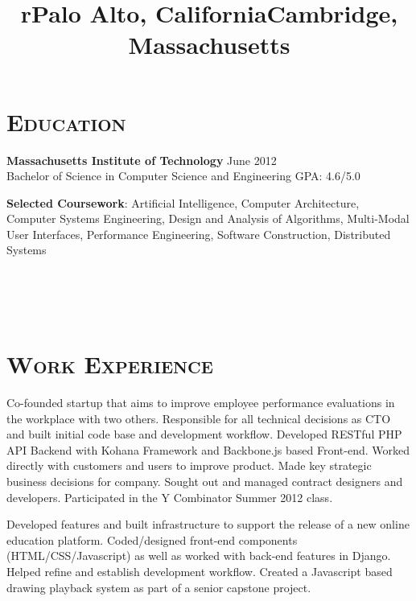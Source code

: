 \begin{resume}


\section{\textsc{Education}}

\textbf{Massachusetts Institute of Technology} \hfill{June 2012}\\
Bachelor of Science in Computer Science and Engineering \hfill{GPA: 4.6/5.0} 

\textbf{Selected Coursework}: Artificial Intelligence, Computer Architecture, Computer Systems Engineering, Design and Analysis of Algorithms, Multi-Modal User Interfaces, Performance Engineering, Software Construction, Distributed Systems



\begin{formatb}
  \title{r}\\
  \\
  \body\\
\end{formatb}

\section{\textsc{Work Experience}}

\title{Palo Alto, California}
\begin{position}
Co-founded startup that aims to improve employee performance evaluations in the workplace with two others. Responsible for all technical decisions as CTO and built initial code base and development workflow. Developed RESTful PHP API Backend with Kohana Framework and Backbone.js based Front-end. Worked directly with customers and users to improve product. Made key strategic business decisions for company. Sought out and managed contract designers and developers. Participated in the Y Combinator Summer 2012 class. 
\end{position}

\title{Cambridge, Massachusetts}
\begin{position}
Developed features and built infrastructure to support the release of a new online education platform. Coded/designed front-end components (HTML/CSS/Javascript) as well as worked with back-end features in Django. Helped refine and establish development workflow. Created a Javascript based drawing playback system as part of a senior capstone project.
\end{position}


\end{resume}
